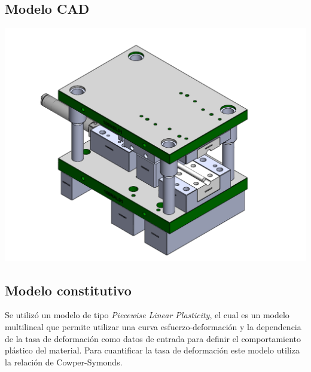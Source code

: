 \subsection{Modelo CAD}


\begin{center}
\includegraphics[scale=0.55]{src/ch3/troquel}
\label{fig:all_tool}
\end{center}

\subsection{Modelo constitutivo}

Se utilizó un modelo de tipo \textit{Piecewise Linear Plasticity}, el cual es un modelo multilineal 
que permite utilizar una curva esfuerzo-deformación y la dependencia de la tasa de deformación 
como datos de entrada para definir el comportamiento plástico del material. Para cuantificar 
la tasa de deformación este modelo utiliza la relación de Cowper-Symonds.\\

